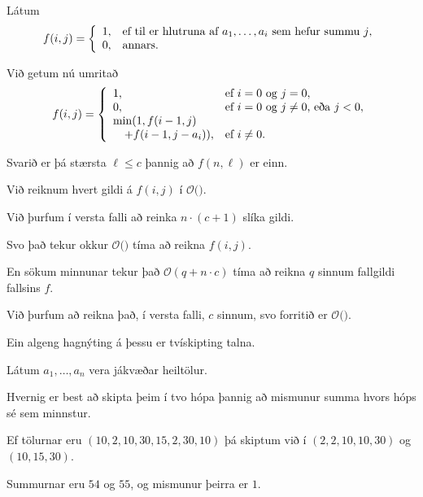 {
    {
        \item<1-> Látum
            \[
            f(i, j) =
                \left \{
                \env{array}
        {
            {l l}
            1, & \text{ef til er hlutruna af $a_1, \dots, a_i$ sem hefur summu $j$},\\
                0, & \text{annars}.
        }
        \right .
            \]
            \item<2-> Við getum nú umritað
            \[
            f(i, j) =
                \left \{
                \env{array}
        {
            {l l}
            1, & \text{ef $i = 0$ og $j = 0$},\\
                0, & \text{ef $i = 0$ og $j \neq 0$, eða $j < 0$},\\
                \min(1, f(i - 1, j) \\
                        \quad + f(i - 1, j - a_i)), & \text{ef $i \neq 0$}.
        }
        \right .
            \]
            \item<3-> Svarið er þá stærsta $\ell \leq c$ þannig að $f(n, \ell)$ er einn.
    }
}

{
}

{
    {
        \item<1-> Við reiknum hvert gildi á $f(i, j)$ í $\mathcal{O}($$)$.
            \item<3-> Við þurfum í versta falli að reinka $n \cdot (c + 1)$ slíka gildi.
            \item<4-> Svo það tekur okkur $\mathcal{O}($$)$ tíma að reikna $f(i, j)$.
            \item<6-> En sökum minnunar tekur það $\mathcal{O}(q + n \cdot c)$ tíma að reikna $q$ sinnum fallgildi fallsins $f$.
            \item<7-> Við þurfum að reikna það, í versta falli, $c$ sinnum, svo forritið er $\mathcal{O}($$)$.
    }
}

{
    {
        \item<1-> Ein algeng hagnýting á þessu er tvískipting talna.
            \item<2-> Látum $a_1, \dots, a_n$ vera jákvæðar heiltölur.
            \item<3-> Hvernig er best að skipta þeim í tvo hópa þannig að mismunur summa hvors hóps sé sem minnstur.
            \item<4-> Ef tölurnar eru $(10, 2, 10, 30, 15, 2, 30, 10)$ þá skiptum við í $(2, 2, 10, 10, 30)$ og $(10, 15, 30)$.
            \item<5-> Summurnar eru $54$ og $55$, og mismunur þeirra er $1$.
    }
}

